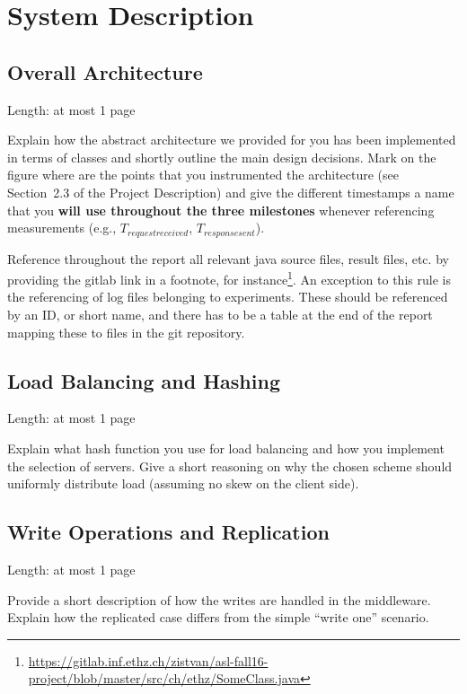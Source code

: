 \documentclass[11pt]{article}
\begin{document}
\section{System Description}\label{sec:system-description}

\subsection{Overall Architecture}\label{sec:desc:architecture}

Length: at most 1 page

Explain how the abstract architecture we provided for you has been implemented in terms of classes and shortly outline the main design decisions. Mark on the figure where are the points that you instrumented the architecture (see Section~2.3 of the Project Description) and give the different timestamps a name that you\textbf{ will use throughout the three milestones }whenever referencing measurements (e.g., $T_{requestreceived}$, $T_{responsesent}$).

Reference throughout the report all relevant java source files, result files, etc. by providing the gitlab link in a footnote, for instance\footnote{\url{https://gitlab.inf.ethz.ch/zistvan/asl-fall16-project/blob/master/src/ch/ethz/SomeClass.java}}. An exception to this rule is the referencing of log files belonging to experiments. These should be referenced by an ID, or short name, and there has to be a table at the end of the report mapping these to files in the git repository.

\subsection{Load Balancing and Hashing}\label{sec:desc:hashing}

Length: at most 1 page

Explain what hash function you use for load balancing and how you implement the selection of servers. Give a short reasoning on why the chosen scheme should uniformly distribute load (assuming no skew on the client side).

\subsection{Write Operations and Replication}\label{sec:desc:writes}

Length: at most 1 page

Provide a short description of how the writes are handled in the middleware. Explain how the replicated case differs from the simple ``write one'' scenario. 
\end{document}
